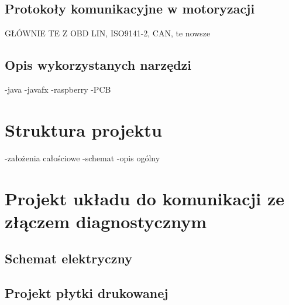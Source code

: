\documentclass[12pt]{article} %
\numberwithin{equation}{subsection}
\numberwithin{figure}{section}
\numberwithin{table}{section}
\begin{document}
		
	
		\newpage	
	
	\subsection{Protokoły komunikacyjne w motoryzacji}
		\hspace{0.5cm}GŁÓWNIE TE Z OBD LIN, ISO9141-2, CAN,
						te nowsze
	
		\newpage	
	
	\subsection{Opis wykorzystanych narzędzi}
		\hspace{0.5cm}
		-java
		-javafx
		-raspberry
		-PCB
	
		\newpage
	
\section{Struktura projektu}
	\hspace{0.5cm}
	-założenia całościowe
	-schemat
	-opis ogólny	
	
	\newpage	
	
\section{Projekt układu do komunikacji ze złączem diagnostycznym}
	\subsection{Schemat elektryczny}
		\hspace{0.5cm}
	
		\newpage
	
	\subsection{Projekt płytki drukowanej}
		\hspace{0.5cm}
	
		\newpage
	
\end{document}
